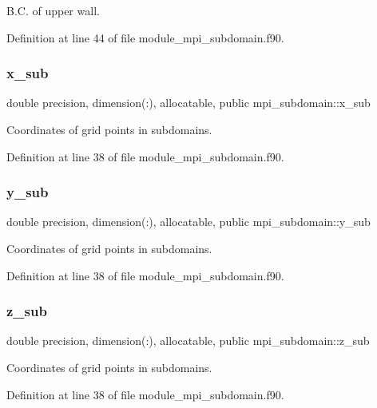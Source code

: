 B.\+C. of upper wall. 



Definition at line 44 of file module\+\_\+mpi\+\_\+subdomain.\+f90.

\mbox{\label{namespacempi__subdomain_a978554e1520c79471ef3793ed1872b37}} 
\subsubsection{\texorpdfstring{x\_sub}{x\_sub}}
{\footnotesize\ttfamily double precision, dimension(\+:), allocatable, public mpi\+\_\+subdomain\+::x\+\_\+sub}



Coordinates of grid points in subdomains. 



Definition at line 38 of file module\+\_\+mpi\+\_\+subdomain.\+f90.

\mbox{\label{namespacempi__subdomain_a58b09abee5f1002de7b20b1b86f5c821}} 
\subsubsection{\texorpdfstring{y\_sub}{y\_sub}}
{\footnotesize\ttfamily double precision, dimension(\+:), allocatable, public mpi\+\_\+subdomain\+::y\+\_\+sub}



Coordinates of grid points in subdomains. 



Definition at line 38 of file module\+\_\+mpi\+\_\+subdomain.\+f90.

\mbox{\label{namespacempi__subdomain_aab6d78e49471a9a3db5ad9df4c3d4041}} 
\subsubsection{\texorpdfstring{z\_sub}{z\_sub}}
{\footnotesize\ttfamily double precision, dimension(\+:), allocatable, public mpi\+\_\+subdomain\+::z\+\_\+sub}



Coordinates of grid points in subdomains. 



Definition at line 38 of file module\+\_\+mpi\+\_\+subdomain.\+f90.

